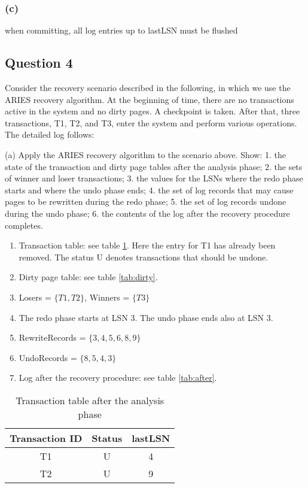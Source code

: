 \documentclass[12pt,a4paper]{article}
\begin{document}
\subsubsection*{(c)}

when committing, all log entries up to lastLSN must be flushed


\subsection*{Question 4}
\label{sec:eq4}

Consider the recovery scenario described in the following, in which we use the
ARIES recovery algorithm. At the beginning of time, there are no transactions active in the system and no
dirty pages. A checkpoint is taken. After that, three transactions, T1, T2, and T3, enter the system and
perform various operations. The detailed log follows:

(a) Apply the ARIES recovery algorithm to the scenario above. Show:
1. the state of the transaction and dirty page tables after the analysis phase;
2. the sets of winner and loser transactions;
3. the values for the LSNs where the redo phase starts and where the undo phase ends;
4. the set of log records that may cause pages to be rewritten during the redo phase;
5. the set of log records undone during the undo phase;
6. the contents of the log after the recovery procedure completes.


\begin{enumerate}
  \item Transaction table: see table \ref{tab:transactions}. Here the entry for T1 has already been removed. The status U denotes transactions that should be undone.
  \item Dirty page table: see table \ref{tab:dirty}.
  \item Losers = $\{T1, T2\}$, Winners = $\{T3\}$
  \item The redo phase starts at LSN 3. The undo phase ends also at LSN 3. 
  \item RewriteRecords = $\{3,4,5,6,8,9\}$
  \item UndoRecords = $\{8,5,4,3\}$
  \item Log after the recovery procedure: see table \ref{tab:after}.
\end{enumerate}

\begin{table}
  \begin{tabular}{c | c | c}
  Transaction ID & Status & lastLSN \\ \hline
  T1 & U & 4\\
  T2 & U & 9 
  \end{tabular}
  \caption{Transaction table after the analysis phase}
  \label{tab:transactions}
\end{table}
\end{document}
